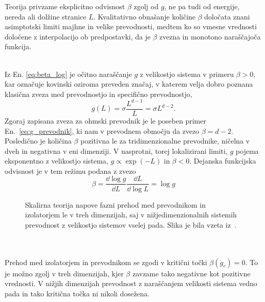 Teorija privzame eksplicitno odvisnost $\beta$ zgolj od $g$, ne pa tudi od energije, nereda ali dolžine stranice $L$. Kvalitativno obnašanje količine $\beta$ določata znani asimptotski limiti majhne in velike prevodnosti, medtem ko so vmesne vrednosti določene z interpolacijo ob predpostavki, da je $\beta$ zvezna in monotono naraščajoča funkcija. \\\\
\begin{minipage}[t]{0.54\textwidth}
Iz En. \eqref{eq:beta_log} je očitno naraščanje $g$ z velikostjo sistema v primeru $\beta>0$, kar označuje kovinski oziroma preveden značaj, v katerem velja dobro poznana klasična zveza med prevodnostjo in specifično prevodnostjo,
\begin{equation}\label{eq:g_prevodnik}
g(L)=\sigma\frac{L^{d-1}}{L}=\sigma L^{d-2}.
\end{equation}
Zgoraj zapisana zveza za ohmski prevodnik je le poseben primer En.~\eqref{eq:g_prevodnik}, ki nam v prevodnem območju da zvezo $\beta=d-2$. Posledično je količina $\beta$ pozitivna le za tridimenzionalne prevodnike, ničelna v dveh in negativna v eni dimenziji. V nasprotni, torej lokalizirani limiti, $g$ pojema eksponentno z velikostjo sistema, $g\propto \exp(-L)$ in $\beta<0$. Dejanska funkcijska odvisnost je v tem režimu podana z zvezo 
\begin{equation}
\beta=\frac{\dd \log g}{\dd L}\frac{\dd L}{\dd \log L}=\log g
\end{equation}
\end{minipage}\hfill
\begin{minipage}[t]{0.43\textwidth}
\begin{figure}[H]
\caption{Skalirna teorija napove fazni prehod med prevodnikom in izolatorjem le v treh dimenzijah, saj v nižjedimenzionalnih sistemih prevodnost z velikostjo sistemov vselej pada. Slika je bila vzeta iz~\cite{lagendijk2009fifty}.}
\label{fig:scalingtheory} 
\end{figure}
\end{minipage}\\\\
Prehod med izolatorjem in prevodnikom se zgodi v kritični točki $\beta(g_c)=0$. To je možno zgolj v treh dimenzijah, kjer $\beta$ zavzame tako negativne kot pozitivne vrednosti. V nižjih dimenzijah prevodnost z naraščanjem velikosti sistema vedno pada in tako kritična točka ni nikoli dosežena. 
